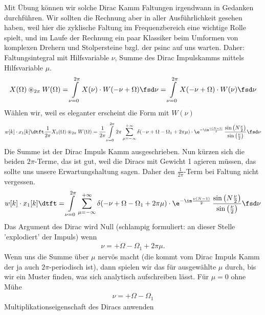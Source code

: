 \begin{ExCalc}
Mit Übung können wir solche Dirac Kamm Faltungen irgendwann in Gedanken durchführen.
Wir sollten die Rechnung aber in aller Ausführlichkeit gesehen haben, weil hier
die zyklische Faltung im Frequenzbereich eine wichtige Rolle spielt,
und im Laufe der Rechnung ein paar Klassiker beim Umformen von komplexen Drehern
und Stolpersteine bzgl. der psinc auf uns warten. Daher:
%
Faltungsintegral mit Hilfsvariable $\nu$, Summe des Dirac Impulskamms mittels
Hilfsvariable $\mu$.
\begin{align}
X(\Omega) \circledast_{2\pi} W(\Omega) =
\int\limits_{\nu=0}^{2\pi} X(\nu) \cdot W(-\nu + \Omega) \fsd \nu =
\int\limits_{\nu=0}^{2\pi} X(-\nu+\Omega) \cdot W(\nu) \fsd \nu
\end{align}
%
Wählen wir, weil es eleganter erscheint die Form mit $W(\nu)$
\begin{align}
w[k] \cdot x_1[k]\dtft
\frac{1}{2\pi}
X_1(\Omega) \circledast_{2\pi} W(\Omega)
=
\frac{1}{2\pi}
\int\limits_{\nu=0}^{2\pi}
2\pi \sum\limits_{\mu=-\infty}^{+\infty}
\delta(-\nu+\Omega-\Omega_1 + 2\pi\mu)
\cdot
\e^{-\im\frac{\nu(N-1)}{2}}\,
\frac{\sin\left(N\frac{\nu}{2}\right)}{\sin\left(\frac{\nu}{2}\right)}\fsd \nu
\end{align}
Die Summe ist der Dirac Impuls Kamm ausgeschrieben. Nun kürzen sich die beiden
$2\pi$-Terme, das ist gut, weil die Diracs mit Gewicht 1 agieren müssen, das
sollte uns unsere Erwartungshaltung sagen.
Daher den $\frac{1}{2\pi}$-Term bei Faltung nicht vergessen.
%
\begin{align}
w[k] \cdot x_1[k]\dtft=
\int\limits_{\nu=0}^{2\pi}
\sum\limits_{\mu=-\infty}^{+\infty}
\delta(-\nu+\Omega-\Omega_1 + 2\pi\mu)
\cdot
\e^{-\im\frac{\nu(N-1)}{2}}\,
\frac{\sin\left(N\frac{\nu}{2}\right)}{\sin\left(\frac{\nu}{2}\right)}\fsd \nu
\end{align}
Das Argument des Dirac wird Null (schlampig formuliert:
an dieser Stelle 'explodiert' der Impuls) wenn
\begin{align}
\nu=+\Omega-\Omega_1 + 2\pi\mu.
\end{align}
Wenn uns die Summe über $\mu$ nervös macht (die kommt vom Dirac Impuls Kamm
der ja auch $2\pi$-periodisch ist), dann spielen wir das für ausgewählte
$\mu$ durch, bis wir ein Muster finden, was sich analytisch aufschreiben lässt.
%
Für $\mu=0$ ohne Mühe
\begin{align}
\nu=+\Omega-\Omega_1
\end{align}
Multiplikationseigenschaft des Diracs anwenden
\begin{align}

\end{align}
\end{ExCalc}
